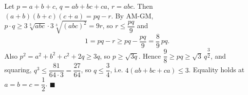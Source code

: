 Let $p=a+b+c$, $q=ab+bc+ca$, $r=abc$. Then $(a+b)(b+c)(c+a)=pq-r$. By AM-GM, $p\cdot q\ge3\sqrt[3]{abc}\cdot3\sqrt[3]{(abc)^2}=9r$, so $r\le\dfrac{pq}{9}$ and
\[
1=pq-r\ge pq-\dfrac{pq}{9}=\dfrac{8}{9}\,pq .
\]
Also $p^2=a^2+b^2+c^2+2q\ge3q$, so $p\ge\sqrt{3q}$. Hence $\dfrac{9}{8}\ge pq\ge\sqrt3\,q^{\dfrac{3}{2}}$, and squaring, $q^3\le\dfrac{81}{64\cdot3}=\dfrac{27}{64}$, so $q\le\dfrac{3}{4}$, i.e. $4(ab+bc+ca)\le3$. Equality holds at $a=b=c=\dfrac{1}{2}$. $\blacksquare$
